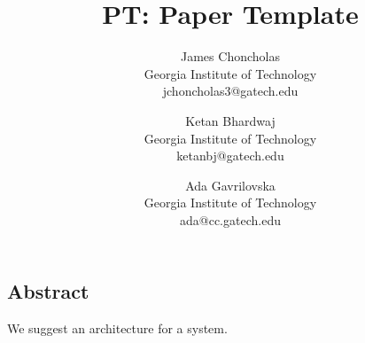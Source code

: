 \documentclass[letterpaper,twocolumn,10pt]{article}
\begin{document}
\date{}

\title{\Large \bf PT: Paper Template}

\author{
  {\rm James Choncholas}\\
  Georgia Institute of Technology\\
  jchoncholas3@gatech.edu
  \and
  {\rm Ketan Bhardwaj}\\
  Georgia Institute of Technology\\
  ketanbj@gatech.edu
  \and
  {\rm Ada Gavrilovska}\\
  Georgia Institute of Technology\\
  ada@cc.gatech.edu
}

\maketitle



\subsection*{Abstract}
We suggest an architecture for a system.
\cite{satyanarayanan1990coda}











%




\end{document}
